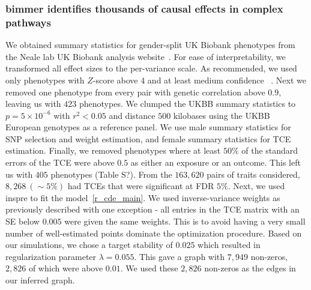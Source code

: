 \documentclass{article}
\begin{document}
\subsubsection*{bimmer identifies thousands of causal effects in complex pathways}
We obtained summary statistics for gender-split UK Biobank phenotypes from
the Neale lab UK Biobank analysis website~\cite{NealeUKBB}. For ease of interpretability,
we transformed all effect sizes to the per-variance scale. As  recommended,
we used only phenotypes with $Z$-score above $4$ and at least medium confidence
~\cite{BulikSullivan2015,NealeUKBB}. Next we removed one phenotype from every pair with genetic
correlation above $0.9$, leaving us with $423$ phenotypes. We clumped the UKBB
summary statistics to $p=5 \times 10^{-6}$ with $r^2 < 0.05$ and distance $500$ kilobases using
the UKBB European genotypes as a reference panel. We use male summary statistics for SNP selection
and weight estimation, and female summary statistics for TCE estimation. Finally, we removed
phenotypes where at least $50\%$ of the standard errors of the TCE were above $0.5$
as either an exposure or an outcome. This left us with $405$ phenotypes (Table S?).
From the $163,620$ pairs of traits considered, $8,268~(\sim 5\%)$ had TCEs that
were significant at FDR $5\%$.
Next, we used inspre to fit the model~\ref{r_cde_main}. We used inverse-variance weights
as previously described with one exception - all entries in the TCE matrix with
an SE below $0.005$ were given the same weights. This is to avoid having a very small
number of well-estimated points dominate the optimization procedure. Based on our simulations,
we chose a target stability of $0.025$ which resulted in regularization 
parameter $\lambda = 0.055$. This gave a graph with $7,949$ non-zeros,
$2,826$ of which were above $0.01$. We used these $2,826$ non-zeros as the edges
in our inferred graph.
\end{document}
